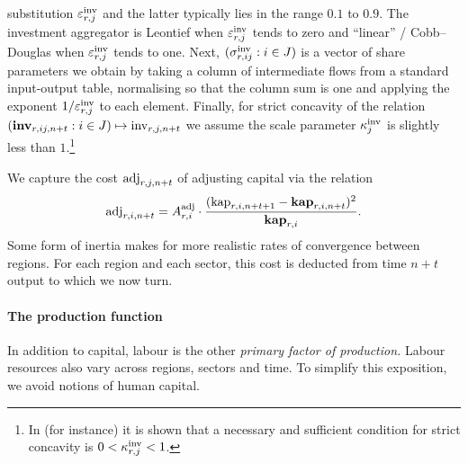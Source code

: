 \documentclass[12pt,a4paper,twoside, draft]{article}
\begin{document}
  substitution $\varepsilon_{r, j} ^ \textup{inv}$ and the latter typically
  lies in the range $ 0.1 $ to $0.9$.
The investment aggregator is Leontief when $\varepsilon_{r, j}^\textup{inv}$
tends to zero and  ``linear'' / Cobb--Douglas when
$\varepsilon_{r, j}^\textup{inv}$ tends to one.
Next, $(\sigma_{r, ij}^\textup{inv}: i \in J)$
is a vector of share parameters we obtain by taking a column of intermediate
flows from a standard input-output table, normalising so that the column sum is
one and applying the exponent $1/\varepsilon_{r, j}^\textup{inv}$ to each
element.
Finally, for strict concavity of the relation
$\left(\mathbf{inv}_{r, ij, n + t} : i \in J\right)
  \mapsto \textup{inv}_{r, j, n + t}$ we assume the scale parameter 
$\kappa_j^\textup{inv}$ is slightly less than $1$.\footnote{
  In \citet[Theorem 2]{Kojic-Concavity} (for instance) it is shown that a
  necessary and sufficient condition for strict concavity is
  $0 < \kappa_{r, j}^\textup{inv} < 1$.
}

We capture the cost $\textup{adj}_{r, j, n + t}$ of adjusting capital
via the relation 
\begin{equation}
  \textup{adj}_{r, i, n + t}
    = A_{r, i} ^ \textup{adj} 
      \cdot \frac{(\textup{kap}_{r, i, n + t + 1}
      - \mathbf{kap}_{r, i, n + t})^2}
        {\mathbf{kap}_{r, i}}.
\end{equation}
Some form of inertia makes for more realistic rates of convergence between
regions.
For each region and each sector, this cost is deducted from time $n + t$ output
to which we now turn.
\paragraph{The production function}
In addition to capital, labour is the other \emph{primary factor of
production.}
Labour resources also vary across regions, sectors and time.
To simplify this exposition, we avoid notions of human capital.
\end{document}
